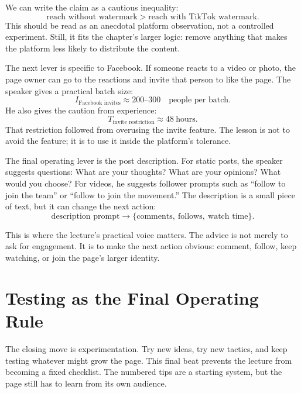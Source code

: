 We can write the claim as a cautious inequality:
\begin{equation}
\text{reach without watermark}
>
\text{reach with TikTok watermark}.
\end{equation}
This should be read as an anecdotal platform observation, not a controlled experiment. Still, it fits the chapter's larger logic: remove anything that makes the platform less likely to distribute the content.

The next lever is specific to Facebook. If someone reacts to a video or photo, the page owner can go to the reactions and invite that person to like the page. The speaker gives a practical batch size:
\begin{equation}
I_{\text{Facebook invites}}
\approx
200\text{--}300
\quad
\text{people per batch}.
\end{equation}
He also gives the caution from experience:
\begin{equation}
T_{\text{invite restriction}}
\approx
48\ \text{hours}.
\end{equation}
That restriction followed from overusing the invite feature. The lesson is not to avoid the feature; it is to use it inside the platform's tolerance.

The final operating lever is the post description. For static posts, the speaker suggests questions: What are your thoughts? What are your opinions? What would you choose? For videos, he suggests follower prompts such as ``follow to join the team'' or ``follow to join the movement.'' The description is a small piece of text, but it can change the next action:
\begin{equation}
\text{description prompt}
\longrightarrow
\{\text{comments},\ \text{follows},\ \text{watch time}\}.
\end{equation}

This is where the lecture's practical voice matters. The advice is not merely to ask for engagement. It is to make the next action obvious: comment, follow, keep watching, or join the page's larger identity.

\section{Testing as the Final Operating Rule}

The closing move is experimentation. Try new ideas, try new tactics, and keep testing whatever might grow the page. This final beat prevents the lecture from becoming a fixed checklist. The numbered tips are a starting system, but the page still has to learn from its own audience.

